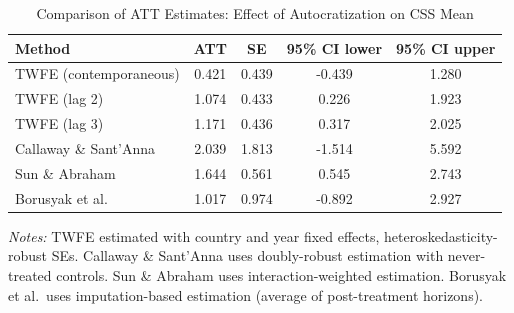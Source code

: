 \begin{table}[htbp]
\centering
\caption{Comparison of ATT Estimates: Effect of Autocratization on CSS Mean}
\label{tab:did_comparison}
\begin{tabular}{lcccc}
\toprule
Method & ATT & SE & 95\% CI lower & 95\% CI upper \\
\midrule
TWFE (contemporaneous) & 0.421 & 0.439 & -0.439 & 1.280 \\
TWFE (lag 2) & 1.074 & 0.433 & 0.226 & 1.923 \\
TWFE (lag 3) & 1.171 & 0.436 & 0.317 & 2.025 \\
Callaway \& Sant'Anna & 2.039 & 1.813 & -1.514 & 5.592 \\
Sun \& Abraham & 1.644 & 0.561 & 0.545 & 2.743 \\
Borusyak et al. & 1.017 & 0.974 & -0.892 & 2.927 \\
\bottomrule
\end{tabular}
\begin{tablenotes}
\small
\item \textit{Notes:} TWFE estimated with country and year fixed effects, heteroskedasticity-robust SEs.
Callaway \& Sant'Anna uses doubly-robust estimation with never-treated controls.
Sun \& Abraham uses interaction-weighted estimation.
Borusyak et al.\ uses imputation-based estimation (average of post-treatment horizons).
\end{tablenotes}
\end{table}
